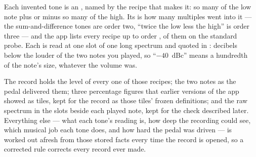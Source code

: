 \documentclass[11pt,a4paper]{article}
\begin{document}
Each invented tone is an , named by the
recipe that makes it: so many of the low note plus or minus so many of
the high. Its  is how many multiples went into it ---
the sum-and-difference tones are order two, ``twice the low less the
high'' is order three --- and the app lists every recipe up to order
\imdMaxOrder{}, \imdRecipeCount{} of them on the standard probe. Each is
read at one slot of one long spectrum and quoted in : decibels
below the louder of the two notes you played, so ``$-40$~dBc'' means a
hundredth of the note's size, whatever the volume was.

The record holds the level of every one of those recipes; the two notes
as the pedal delivered them; three percentage figures that earlier
versions of the app showed as tiles, kept for the record as those tiles'
frozen definitions; and the raw spectrum in the slots beside each played
note, kept for the check described later. Everything else --- what each
tone's reading is, how deep the recording could see, which musical job
each tone does, and how hard the pedal was driven --- is worked out
afresh from those stored facts every time the record is opened, so a
corrected rule corrects every record ever made.
\end{document}
